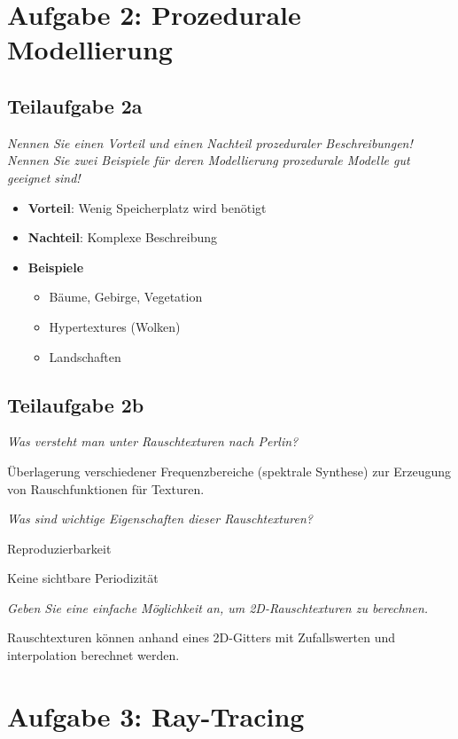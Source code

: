 \documentclass[a4paper]{scrartcl}
\begin{document}
\clearpage
\section*{Aufgabe 2: Prozedurale Modellierung}
\subsection*{Teilaufgabe 2a}
\textit{Nennen Sie einen Vorteil und einen Nachteil prozeduraler Beschreibungen! Nennen Sie
zwei Beispiele für deren Modellierung prozedurale Modelle gut geeignet sind!}

\begin{itemize}
    \item \textbf{Vorteil}: Wenig Speicherplatz wird benötigt
    \item \textbf{Nachteil}: Komplexe Beschreibung
    \item \textbf{Beispiele}
    \begin{itemize}
        \item Bäume, Gebirge, Vegetation
        \item Hypertextures (Wolken)
        \item Landschaften
    \end{itemize}
\end{itemize}

\subsection*{Teilaufgabe 2b}
\textit{Was versteht man unter Rauschtexturen nach Perlin?}

Überlagerung verschiedener Frequenzbereiche (spektrale Synthese) zur Erzeugung
von Rauschfunktionen für Texturen.

\textit{Was sind wichtige Eigenschaften dieser Rauschtexturen?}

\begin{enumerate*}[label=(\arabic*)]
    \item Reproduzierbarkeit
    \item Keine sichtbare Periodizität
\end{enumerate*}

\textit{Geben Sie eine einfache Möglichkeit an, um 2D-Rauschtexturen zu berechnen.}

Rauschtexturen können anhand eines 2D-Gitters mit Zufallswerten und
interpolation berechnet werden.

\section*{Aufgabe 3: Ray-Tracing}
\end{document}
